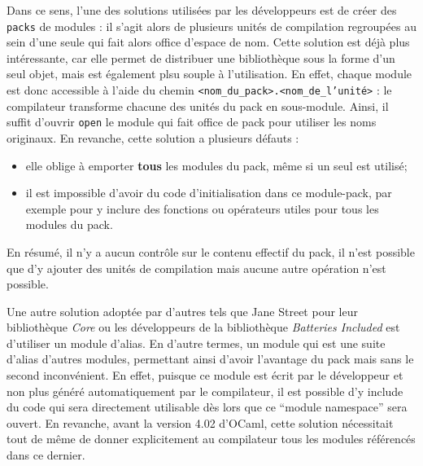 \documentclass[11pt,a4paper]{report}
\begin{document}
Dans ce sens, l'une des solutions utilisées par les développeurs est de créer
des \texttt{packs} de modules : il s'agit alors de plusieurs unités de
compilation regroupées au sein d'une seule qui fait alors office d'espace de
nom. Cette solution est déjà plus intéressante, car elle permet de distribuer
une bibliothèque sous la forme d'un seul objet, mais est également plsu souple à
l'utilisation. En effet, chaque module est donc accessible à l'aide du chemin
\texttt{<nom\_du\_pack>.<nom\_de\_l'unité>} : le compilateur transforme chacune
des unités du pack en sous-module. Ainsi, il suffit d'ouvrir \texttt{open} le
module qui fait office de pack pour utiliser les noms originaux. En revanche,
cette solution a plusieurs défauts :
\begin{itemize}
\item elle oblige à emporter \textbf{tous} les modules du pack, même si un seul
  est utilisé;
\item il est impossible d'avoir du code d'initialisation dans ce module-pack,
  par exemple pour y inclure des fonctions ou opérateurs utiles pour tous les
  modules du pack.
\end{itemize}
En résumé, il n'y a aucun contrôle sur le contenu effectif du pack, il n'est
possible que d'y ajouter des unités de compilation mais aucune autre opération
n'est possible.

Une autre solution adoptée par d'autres tels que Jane Street pour leur
bibliothèque \emph{Core} ou les développeurs de la bibliothèque \emph{Batteries
  Included} est d'utiliser un module d'alias. En d'autre termes, un module qui
est une suite d'alias d'autres modules, permettant ainsi d'avoir l'avantage du
pack mais sans le second inconvénient. En effet, puisque ce module est écrit par
le développeur et non plus généré automatiquement par le compilateur, il est
possible d'y include du code qui sera directement utilisable dès lors que ce
``module namespace'' sera ouvert. En revanche, avant la version 4.02 d'OCaml,
cette solution nécessitait tout de même de donner explicitement au compilateur
tous les modules référencés dans ce dernier.
\end{document}

